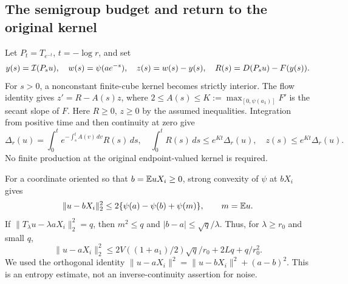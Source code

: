 \subsection{The semigroup budget and return to the original kernel}
Let $P_t=T_{e^{-t}}$, $t=-\log r$, and set
\[
 y(s)=\mathcal I(P_su),\quad w(s)=\psi(ae^{-s}),\quad z(s)=w(s)-y(s),
 \quad R(s)=D(P_su)-F(y(s)).
\]
For $s>0$, a nonconstant finite-cube kernel becomes strictly interior.
The flow identity gives $z'=R-A(s)z$, where
$2\le A(s)\le K:=\max_{[0,\psi(a_1)]}F'$ is the secant slope of $F$.
Here $R\ge0$, $z\ge0$ by the assumed inequalities. Integration from
positive time and then continuity at zero give
\begin{equation}\label{eq:budget}
 \Delta_r(u)=\int_0^t e^{-\int_s^t A(v)\,dv}R(s)\,ds,
 \quad \int_0^tR(s)\,ds\le e^{Kt}\Delta_r(u),
 \quad z(s)\le e^{Kt}\Delta_r(u).
\end{equation}
No finite production at the original endpoint-valued kernel is required.

For a coordinate oriented so that $b=\mathbb E uX_i\ge0$, strong convexity
of $\psi$ at $bX_i$ gives
\[
 \|u-bX_i\|_2^2\le2\{\psi(a)-\psi(b)+\psi(m)\},\qquad m=\mathbb E u.
\]
If $\|T_\lambda u-\lambda aX_i\|_2^2=q$, then $m^2\le q$ and
$|b-a|\le\sqrt q/\lambda$. Thus, for $\lambda\ge r_0$ and small $q$,
\begin{equation}\label{eq:return}
 \|u-aX_i\|_2^2
 \le 2V((1+a_1)/2)\sqrt q/r_0+2Lq+q/r_0^2.
\end{equation}
We used the orthogonal identity
$\|u-aX_i\|^2=\|u-bX_i\|^2+(a-b)^2$.
This is an entropy estimate, not an inverse-continuity assertion for noise.


